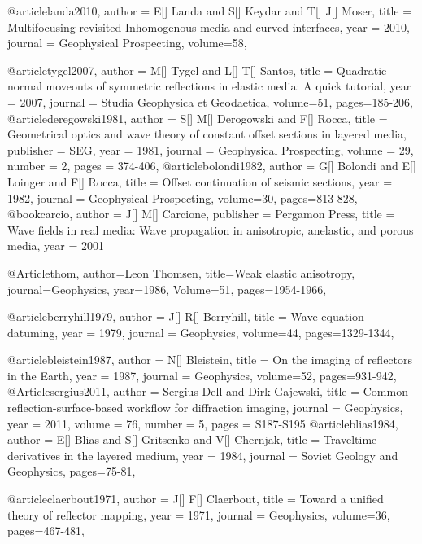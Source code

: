 {@article{landa2010,
  author =	 {E[] Landa and S[] Keydar and T[] J[] Moser},
  title =	 {Multifocusing revisited-Inhomogenous media and curved interfaces},
  year =	 2010,
  journal =	 {Geophysical Prospecting},
  volume={58},
}

@article{tygel2007,
  author =	 {M[] Tygel and L[] T[] Santos},
  title =	 {Quadratic normal moveouts of symmetric reflections in elastic media: A quick tutorial},
  year =	 2007,
  journal =	 {Studia Geophysica et Geodaetica},
  volume={51},
 pages=185-206,
}
@article{deregowski1981,
  author =	 {S[] M[] Derogowski and F[] Rocca},
  title =	 {Geometrical optics and wave theory of constant offset sections in layered media},
  publisher =	 {SEG},
  year =	 1981,
  journal =	 {Geophysical Prospecting},
  volume =	 29,
  number =	 2,
  pages =	 {374-406},
}
@article{bolondi1982,
  author =	 {G[] Bolondi and E[] Loinger and F[] Rocca},
  title =	 {Offset continuation of seismic sections},
  year =	 1982,
  journal =	 {Geophysical Prospecting},
  volume={30},
 pages=813-828,
}
@book{carcio,
   author = {J[] M[] Carcione},
   publisher = {Pergamon Press},
   title = {Wave fields in real media: Wave propagation in anisotropic, anelastic, and porous media},
   year = {2001}
}

@Article{thom,
  author={Leon Thomsen},
  title={Weak elastic anisotropy},
  journal={Geophysics},
  year=1986,
  Volume=51,
  pages={1954-1966},
}


@article{berryhill1979,
  author =	 {J[] R[] Berryhill},
  title =	 {Wave equation datuming},
  year =	 1979,
  journal =	 {Geophysics},
  volume={44},
 pages=1329-1344,
}

@article{bleistein1987,
  author =	 {N[] Bleistein},
  title =	 {On the imaging of reflectors in the Earth},
  year =	 1987,
  journal =	 {Geophysics},
  volume={52},
 pages=931-942,
}
@Article{sergius2011,
  author =       {Sergius Dell and Dirk Gajewski},
  title =     {Common-reflection-surface-based workflow for diffraction imaging}, 
  journal = {Geophysics},
  year =         2011,
  volume =       76,
  number =       5,
  pages =        {S187-S195}
}
@article{blias1984,
  author =	 {E[] Blias and S[] Gritsenko and V[] Chernjak},
  title =	 {Traveltime derivatives in the layered medium},
  year =	 1984,
  journal =	 {Soviet Geology and Geophysics},
 pages=75-81,
}

@article{claerbout1971,
  author =	 {J[] F[] Claerbout},
  title =	 {Toward a unified theory of reflector mapping},
  year =	 1971,
  journal =	 {Geophysics},
  volume={36},
 pages=467-481,
}

}
